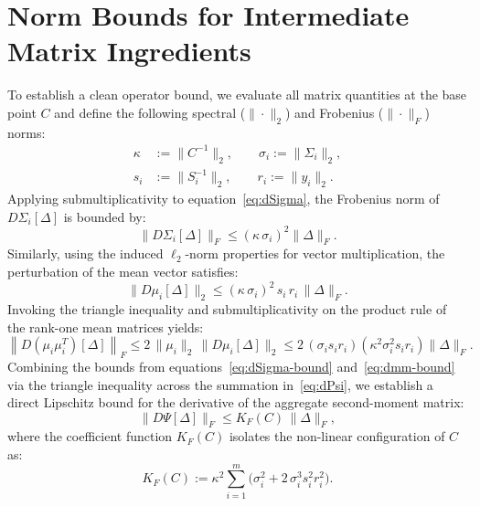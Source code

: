\documentclass[11pt,a4paper]{article}
\begin{document}
\section{Norm Bounds for Intermediate Matrix Ingredients}
To establish a clean operator bound, we evaluate all matrix quantities at the base point $C$ and define the following spectral ($\|\cdot\|_2$) and Frobenius ($\|\cdot\|_F$) norms:
\begin{align*}
\kappa &:= \|C^{-1}\|_2, \qquad \sigma_i := \|\Sigma_i\|_2, \\
s_i    &:= \|S_i^{-1}\|_2, \qquad r_i := \|y_i\|_2.
\end{align*}
Applying submultiplicativity to equation~\eqref{eq:dSigma}, the Frobenius norm of $D\Sigma_i[\Delta]$ is bounded by:
\begin{equation}\label{eq:dSigma-bound}
\|D\Sigma_i[\Delta]\|_F \le (\kappa\,\sigma_i)^2 \|\Delta\|_F.
\end{equation}
Similarly, using the induced $\ell_2$-norm properties for vector multiplication, the perturbation of the mean vector satisfies:
\begin{equation}\label{eq:dmu-bound}
\|D\mu_i[\Delta]\|_2 \le (\kappa\,\sigma_i)^2\, s_i\,r_i\,\|\Delta\|_F.
\end{equation}
Invoking the triangle inequality and submultiplicativity on the product rule of the rank-one mean matrices yields:
\begin{equation}\label{eq:dmm-bound}
\left\|D(\mu_i\mu_i^T)[\Delta]\right\|_F \le 2\,\|\mu_i\|_2\,\|D\mu_i[\Delta]\|_2 \le 2\, (\sigma_i s_i r_i)\left(\kappa^2\sigma_i^2 s_i r_i\right)\|\Delta\|_F.
\end{equation}
Combining the bounds from equations~\eqref{eq:dSigma-bound} and~\eqref{eq:dmm-bound} via the triangle inequality across the summation in~\eqref{eq:dPsi}, we establish a direct Lipschitz bound for the derivative of the aggregate second-moment matrix:
\begin{equation}\label{eq:Kf-def}
\|D\Psi[\Delta]\|_F \le K_F(C)\,\|\Delta\|_F,
\end{equation}
where the coefficient function $K_F(C)$ isolates the non-linear configuration of $C$ as:
\begin{equation}
K_F(C) := \kappa^2 \sum_{i=1}^m \Big( \sigma_i^2 + 2\,\sigma_i^3 s_i^2 r_i^2 \Big).
\end{equation}
\end{document}
